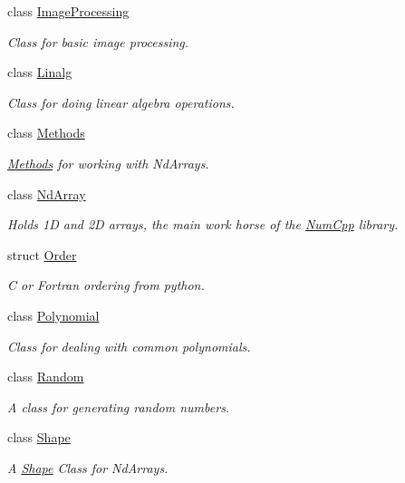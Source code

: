 \begin{DoxyCompactItemize}
class \mbox{\hyperlink{class_num_cpp_1_1_image_processing}{Image\+Processing}}
\begin{DoxyCompactList}\small\item\em Class for basic image processing. \end{DoxyCompactList}\item 
class \mbox{\hyperlink{class_num_cpp_1_1_linalg}{Linalg}}
\begin{DoxyCompactList}\small\item\em Class for doing linear algebra operations. \end{DoxyCompactList}\item 
class \mbox{\hyperlink{class_num_cpp_1_1_methods}{Methods}}
\begin{DoxyCompactList}\small\item\em \mbox{\hyperlink{class_num_cpp_1_1_methods}{Methods}} for working with Nd\+Arrays. \end{DoxyCompactList}\item 
class \mbox{\hyperlink{class_num_cpp_1_1_nd_array}{Nd\+Array}}
\begin{DoxyCompactList}\small\item\em Holds 1D and 2D arrays, the main work horse of the \mbox{\hyperlink{namespace_num_cpp}{Num\+Cpp}} library. \end{DoxyCompactList}\item 
struct \mbox{\hyperlink{struct_num_cpp_1_1_order}{Order}}
\begin{DoxyCompactList}\small\item\em C or Fortran ordering from python. \end{DoxyCompactList}\item 
class \mbox{\hyperlink{class_num_cpp_1_1_polynomial}{Polynomial}}
\begin{DoxyCompactList}\small\item\em Class for dealing with common polynomials. \end{DoxyCompactList}\item 
class \mbox{\hyperlink{class_num_cpp_1_1_random}{Random}}
\begin{DoxyCompactList}\small\item\em A class for generating random numbers. \end{DoxyCompactList}\item 
class \mbox{\hyperlink{class_num_cpp_1_1_shape}{Shape}}
\begin{DoxyCompactList}\small\item\em A \mbox{\hyperlink{class_num_cpp_1_1_shape}{Shape}} Class for Nd\+Arrays. \end{DoxyCompactList}\item 

\end{DoxyCompactItemize}
